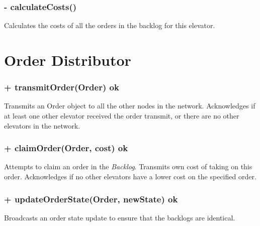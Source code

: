 \documentclass[11pt,a4paper]{article}
\begin{document}
\subsubsection*{- calculateCosts()}
Calculates the costs of all the orders in the backlog for this elevator.
\section*{Order Distributor}
\subsubsection*{+ transmitOrder(Order) ok}
Transmits an Order object to all the other nodes in the network. Acknowledges if at least one other elevator received the order transmit, or there are no other elevators in the network.
\subsubsection*{+ claimOrder(Order, cost) ok}
Attempts to claim an order in the \textit{Backlog}. Transmits own cost of taking on this order. Acknowledges if no other elevators have a lower cost on the specified order.
\subsubsection*{+ updateOrderState(Order, newState) ok}
Broadcasts an order state update to ensure that the backlogs are identical.
\end{document}
